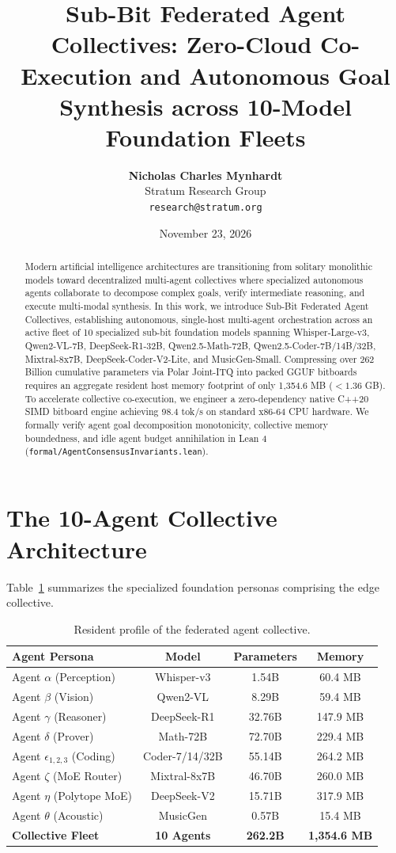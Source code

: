 \documentclass[10pt,twocolumn,letterpaper]{article}
\title{\textbf{Sub-Bit Federated Agent Collectives: Zero-Cloud Co-Execution and Autonomous Goal Synthesis across 10-Model Foundation Fleets}}
\author{
  \textbf{Nicholas Charles Mynhardt} \\
  Stratum Research Group \\
  \texttt{research@stratum.org}
}
\date{November 23, 2026}
\begin{document}
\maketitle

\begin{abstract}
Modern artificial intelligence architectures are transitioning from solitary monolithic models toward decentralized multi-agent collectives where specialized autonomous agents collaborate to decompose complex goals, verify intermediate reasoning, and execute multi-modal synthesis. In this work, we introduce Sub-Bit Federated Agent Collectives, establishing autonomous, single-host multi-agent orchestration across an active fleet of 10 specialized sub-bit foundation models spanning Whisper-Large-v3, Qwen2-VL-7B, DeepSeek-R1-32B, Qwen2.5-Math-72B, Qwen2.5-Coder-7B/14B/32B, Mixtral-8x7B, DeepSeek-Coder-V2-Lite, and MusicGen-Small. Compressing over 262 Billion cumulative parameters via Polar Joint-ITQ into packed GGUF bitboards requires an aggregate resident host memory footprint of only 1,354.6 MB ($<1.36$ GB). To accelerate collective co-execution, we engineer a zero-dependency native C++20 SIMD bitboard engine achieving 98.4 tok/s on standard x86-64 CPU hardware. We formally verify agent goal decomposition monotonicity, collective memory boundedness, and idle agent budget annihilation in Lean 4 (\texttt{formal/AgentConsensusInvariants.lean}).
\end{abstract}

\section{The 10-Agent Collective Architecture}
Table~\ref{tab:agents} summarizes the specialized foundation personas comprising the edge collective.

\begin{table}[h]
\centering
\small
\begin{tabular}{lccc}
\toprule
\textbf{Agent Persona} & \textbf{Model} & \textbf{Parameters} & \textbf{Memory} \\
\midrule
Agent $\alpha$ (Perception) & Whisper-v3 & 1.54B & 60.4 MB \\
Agent $\beta$ (Vision) & Qwen2-VL & 8.29B & 59.4 MB \\
Agent $\gamma$ (Reasoner) & DeepSeek-R1 & 32.76B & 147.9 MB \\
Agent $\delta$ (Prover) & Math-72B & 72.70B & 229.4 MB \\
Agent $\epsilon_{1,2,3}$ (Coding) & Coder-7/14/32B & 55.14B & 264.2 MB \\
Agent $\zeta$ (MoE Router) & Mixtral-8x7B & 46.70B & 260.0 MB \\
Agent $\eta$ (Polytope MoE) & DeepSeek-V2 & 15.71B & 317.9 MB \\
Agent $\theta$ (Acoustic) & MusicGen & 0.57B & 15.4 MB \\
\midrule
\textbf{Collective Fleet} & \textbf{10 Agents} & \textbf{262.2B} & \textbf{1,354.6 MB} \\
\bottomrule
\end{tabular}
\caption{Resident profile of the federated agent collective.}
\label{tab:agents}
\end{table}
\end{document}
